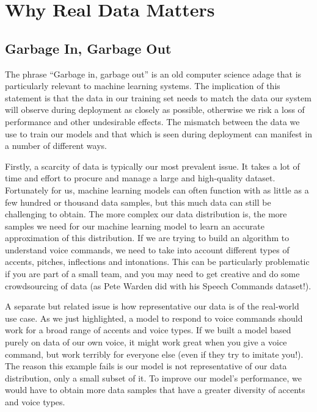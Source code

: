 \section{Why Real Data Matters}


\subsection{Garbage In, Garbage Out}

The phrase “Garbage in, garbage out” is an old computer science adage that is particularly relevant to machine learning systems. The implication of this statement is that the data in our training set needs to match the data our system will observe during deployment as closely as possible, otherwise we risk a loss of performance and other undesirable effects. The mismatch between the data we use to train our models and that which is seen during deployment can manifest in a number of different ways.
    
    Firstly, a scarcity of data is typically our most prevalent issue. It takes a lot of time and effort to procure and manage a large and high-quality dataset. Fortunately for us, machine learning models can often function with as little as a few hundred or thousand data samples, but this much data can still be challenging to obtain. The more complex our data distribution is, the more samples we need for our machine learning model to learn an accurate approximation of this distribution. If we are trying to build an algorithm to understand voice commands, we need to take into account different types of accents, pitches, inflections and intonations. This can be particularly problematic if you are part of a small team, and you may need to get creative and do some crowdsourcing of data (as Pete Warden did with his Speech Commands dataset!).
    
    A separate but related issue is how representative our data is of the real-world use case. As we just highlighted, a model to respond to voice commands should work for a broad range of accents and voice types. If we built a model based purely on data of our own voice, it might work great when you give a voice command, but work terribly for everyone else (even if they try to imitate you!). The reason this example fails is our model is not representative of our data distribution, only a small subset of it. To improve our model’s performance, we would have to obtain more data samples that have a greater diversity of accents and voice types.
    
